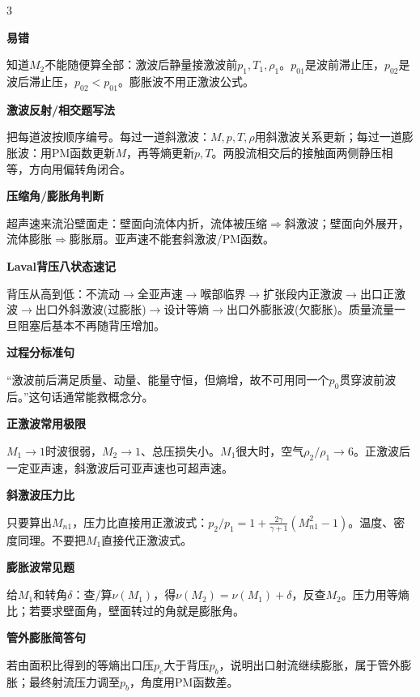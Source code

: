 \documentclass[a4paper]{article}
\newcommand{\qt}[1]{\vspace{0.25pt}\colorbox{Q}{\parbox{\dimexpr\linewidth-2\fboxsep}{\color{white}\bfseries #1}}\par}
\newcommand{\sect}[1]{\qt{#1}}
\begin{document}
\begin{multicols}{3}
{\sect{易错}
知道$M_2$不能随便算全部：激波后静量接激波前$p_1,T_1,\rho_1$。$p_{01}$是波前滞止压，$p_{02}$是波后滞止压，$p_{02}<p_{01}$。膨胀波不用正激波公式。
\sect{激波反射/相交题写法}
把每道波按顺序编号。每过一道斜激波：$M,p,T,\rho$用斜激波关系更新；每过一道膨胀波：用PM函数更新$M$，再等熵更新$p,T$。两股流相交后的接触面两侧静压相等，方向用偏转角闭合。
\sect{压缩角/膨胀角判断}
超声速来流沿壁面走：壁面向流体内折，流体被压缩$\Rightarrow$斜激波；壁面向外展开，流体膨胀$\Rightarrow$膨胀扇。亚声速不能套斜激波/PM函数。
\sect{Laval背压八状态速记}
背压从高到低：不流动$\to$全亚声速$\to$喉部临界$\to$扩张段内正激波$\to$出口正激波$\to$出口外斜激波(过膨胀)$\to$设计等熵$\to$出口外膨胀波(欠膨胀)。质量流量一旦阻塞后基本不再随背压增加。
\sect{过程分标准句}
“激波前后满足质量、动量、能量守恒，但熵增，故不可用同一个$p_0$贯穿波前波后。”这句话通常能救概念分。
\sect{正激波常用极限}
$M_1\to1$时波很弱，$M_2\to1$、总压损失小。$M_1$很大时，空气$\rho_2/\rho_1\to6$。正激波后一定亚声速，斜激波后可亚声速也可超声速。
\sect{斜激波压力比}
只要算出$M_{n1}$，压力比直接用正激波式：$p_2/p_1=1+\frac{2\gamma}{\gamma+1}(M_{n1}^2-1)$。温度、密度同理。不要把$M_1$直接代正激波式。
\sect{膨胀波常见题}
给$M_1$和转角$\delta$：查/算$\nu(M_1)$，得$\nu(M_2)=\nu(M_1)+\delta$，反查$M_2$。压力用等熵比；若要求壁面角，壁面转过的角就是膨胀角。
\sect{管外膨胀简答句}
若由面积比得到的等熵出口压$p_e$大于背压$p_b$，说明出口射流继续膨胀，属于管外膨胀；最终射流压力调至$p_b$，角度用PM函数差。
}


\end{multicols}
\end{document}
